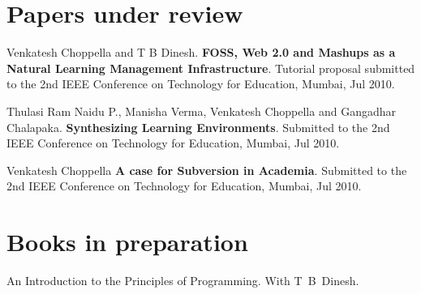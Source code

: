 \documentclass[11pt,margin,line]{res}
\begin{document}
\begin{resume}


\vspace{2em}




\newpage

\section{\sc Papers under review}

Venkatesh Choppella and T B Dinesh.  {\bf FOSS, Web 2.0 and
  Mashups as a Natural Learning Management Infrastructure}.
Tutorial proposal submitted to the 2nd IEEE Conference on
Technology for Education, Mumbai, Jul 2010.

Thulasi Ram Naidu P., Manisha Verma, Venkatesh Choppella and
Gangadhar Chalapaka.  {\bf Synthesizing Learning
  Environments}.  Submitted to the 2nd IEEE Conference on
Technology for Education, Mumbai, Jul 2010.

Venkatesh Choppella {\bf A case for Subversion in Academia}.
Submitted to the 2nd IEEE Conference on Technology for
Education, Mumbai, Jul 2010.

\vspace{2em}

\section{\sc Books in preparation}

An Introduction to the Principles of Programming.  With
T~B~Dinesh.

\vspace{2em}


\end{resume}
\end{document}
